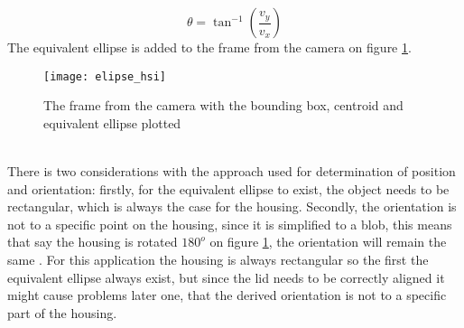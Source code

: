 \begin{equation}
\theta = \tan^{-1}\left(\frac{v_y}{v_x}\right)
\end{equation}   
The equivalent ellipse is added to the frame from the camera on figure \ref{fig_ellipse}.
\begin{figure}[htbp!]
	\centering
	\texttt{[image: elipse\_hsi]}
	\caption{The frame from the camera with the bounding box, centroid and equivalent ellipse plotted}
	\label{fig_ellipse}
\end{figure}\\
There is two considerations with the approach used for determination of position and orientation: firstly, for the equivalent ellipse to exist, the object needs to be rectangular, which is always the case for the housing. Secondly, the orientation is not to a specific  point on the housing, since it is simplified to a blob, this means that say the housing is rotated $180^o$ on figure \ref{fig_ellipse}, the orientation will remain the same . For this application the housing is always rectangular so the first the equivalent ellipse always exist, but since the lid needs to be correctly aligned it might cause problems later one, that the derived orientation is not to a specific part of the housing.
